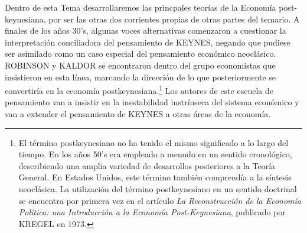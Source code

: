 \documentclass[10pt,a4paper]{article}
\begin{document}
Dentro de esta Tema desarrollaremos las princpales teorías de la Economía post-keynesiana, por ser las otras dos corrientes propias de otras partes del temario.  A finales de los años 30's, algunas voces alternativas comenzaron a cuestionar la interpretación conciliadora del pensamiento de KEYNES, negando que pudiese ser asimilado como un caso especial del pensamiento económico neoclásico. ROBINSON y KALDOR se encontraron dentro del grupo economistas que insistieron en esta línea, marcando la dirección de lo que posteriormente se convertiría en la economía postkeynesiana.\footnote{%
    El término postkeynesiano no ha tenido el mismo significado a lo largo del tiempo. En los años 50's era empleado a menudo en un sentido cronológico, describiendo una amplia variedad de desarrollos posteriores a la Teoría General. En Estados Unidos, este término también comprendía a la síntesis neoclásica. La utilización del término postkeynesiano en un sentido doctrinal se encuentra por primera vez en el artículo \textit{La Reconstrucción de la Economía Política: una Introducción a la Economía Post-Keynesiana}, publicado por KREGEL en 1973.
} Los autores de este escuela de pensamiento van a insistir en la inestabilidad instrínseca del sistema económico y van a extender el pensamiento de KEYNES a otras áreas de la economía.
\end{document}
